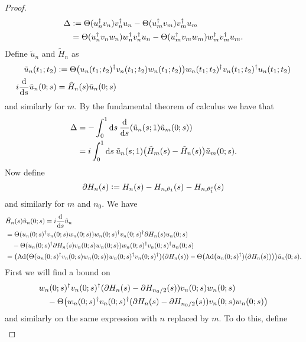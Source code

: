 \documentclass[12pt,a4paper,twoside]{article}
\renewcommand{\d}{\text{d}}
\newcommand{\defeq}{\vcentcolon=}
\let\originalleft\left
\let\originalright\right
\renewcommand{\left}{\mathopen{}\mathclose\bgroup\originalleft}
\renewcommand{\right}{\aftergroup\egroup\originalright}
\newcommand{\Ad}[1]{\textrm{Ad}\left(#1\right)}
\theoremstyle{definition}
\numberwithin{equation}{section}
\begin{document}
\begin{proof}
\begin{align}
		\Delta&\defeq\Theta(u_n^\dagger v_n)v_n^\dagger u_n-\Theta(u_m^\dagger v_m)v_m^\dagger u_m\\
		&=\Theta(u_n^\dagger v_n w_n)w_n^\dagger v_n^\dagger u_n -\Theta(u_m^\dagger v_m w_m)w_m^\dagger v_m^\dagger u_m.
	\end{align}
	Define $\tilde{u}_n$ and $\tilde{H}_n$ as
	\begin{align}
		\tilde{u}_n(t_1;t_2)&\defeq \Theta\left(u_n(t_1;t_2)^\dagger v_n(t_1;t_2) w_n(t_1;t_2)\right)w_n(t_1;t_2)^\dagger v_n(t_1;t_2)^\dagger u_n(t_1;t_2)\\
		i\frac{\d}{\d s}\tilde{u}_n(0;s)&=\tilde{H}_n(s)\tilde{u}_n(0;s)
	\end{align}
	and similarly for $m$. By the fundamental theorem of calculus we have that
	\begin{align}
		\Delta&=-\int_0^1\d s\:\frac{\d}{\d s}\left(\tilde{u}_n(s;1)\tilde{u}_m(0;s)\right)\\
		&=i\int_0^1\d s \: \tilde{u}_n(s;1)\left(\tilde{H}_m(s)-\tilde{H}_n(s)\right)\tilde{u}_m(0;s).
	\end{align}
	Now define
	\begin{equation}
		\partial H_n(s)\defeq H_n(s)-H_{n,\theta_1}(s)-H_{n,\theta_1^c}(s)
	\end{equation}
	and similarly for $m$ and $n_0$. We have
	\begin{align}
		&\tilde{H}_n(s)\tilde{u}_n(0;s)=i\frac{\d}{\d s}\tilde{u}_n\\
		&=\Theta(u_n(0;s)^\dagger v_n(0;s)w_n(0;s))w_n(0;s)^\dagger v_n(0;s)^\dagger \partial H_n(s) u_n(0;s)\\
		\nonumber
		&\quad-\Theta(u_n(0;s)^\dagger \partial H_n(s) v_n(0;s)w_n(0;s))w_n(0;s)^\dagger v_n(0;s)^\dagger u_n(0;s)\\
		&=\left(\Ad{\Theta(u_n(0;s)^\dagger v_n(0;s)w_n(0;s))w_n(0;s)^\dagger v_n(0;s)^\dagger}(\partial H_n(s))-\Theta\left(\Ad{u_n(0;s)^\dagger}(\partial H_n(s))\right)\right)\tilde{u}_n(0;s).
	\end{align}
	First we will find a bound on
	\begin{align}
		&w_n(0;s)^\dagger v_n(0;s)^\dagger(\partial H_n(s)-\partial H_{n_0/2}(s))v_n(0;s)w_n(0;s)\\
	\nonumber
		&\quad-\Theta\left(w_n(0;s)^\dagger v_n(0;s)^\dagger(\partial H_n(s)-\partial H_{n_0/2}(s))v_n(0;s)w_n(0;s)\right)
	\end{align}
	and similarly on the same expression with $n$ replaced by $m$. To do this, define
	\begin{align}

\end{align}
\end{proof}
\end{document}
